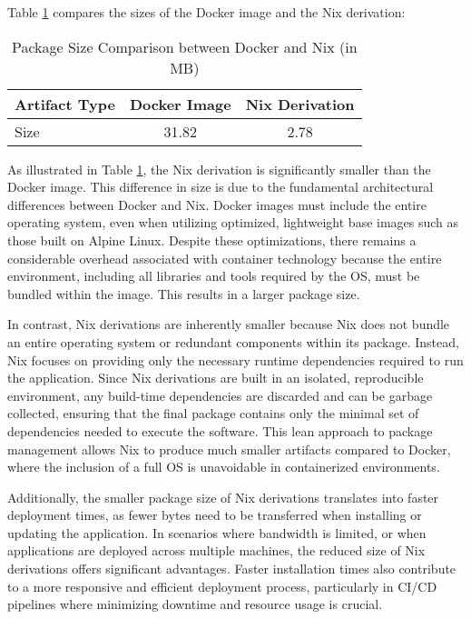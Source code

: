 Table \ref{tab:package_size} compares the sizes of the Docker image and the Nix derivation:

\begin{table}[H]
	\centering
	\caption{Package Size Comparison between Docker and Nix (in MB)}
	\label{tab:package_size}
	\begin{tabular}{|l|c|c|}
		\hline
		\textbf{Artifact Type} & \textbf{Docker Image} & \textbf{Nix Derivation} \\
		\hline
		Size                   & 31.82                 & 2.78                    \\
		\hline
	\end{tabular}
\end{table}

As illustrated in Table \ref{tab:package_size}, the Nix derivation is significantly smaller
than the Docker image. This difference in size is due to the fundamental architectural
differences between Docker and Nix. Docker images must include the entire operating system,
even when utilizing optimized, lightweight base images such as those built on Alpine Linux.
Despite these optimizations, there remains a considerable overhead associated with container
technology because the entire environment, including all libraries and tools required by
the OS, must be bundled within the image. This results in a larger package size.

In contrast, Nix derivations are inherently smaller because Nix does not bundle an entire
operating system or redundant components within its package. Instead, Nix focuses on
providing only the necessary runtime dependencies required to run the application. Since
Nix derivations are built in an isolated, reproducible environment, any build-time
dependencies are discarded and can be garbage collected, ensuring that the final package
contains only the minimal set of dependencies needed to execute the software. This lean
approach to package management allows Nix to produce much smaller artifacts compared to
Docker, where the inclusion of a full OS is unavoidable in containerized environments.

Additionally, the smaller package size of Nix derivations translates into faster deployment
times, as fewer bytes need to be transferred when installing or updating the application.
In scenarios where bandwidth is limited, or when applications are deployed across multiple
machines, the reduced size of Nix derivations offers significant advantages. Faster
installation times also contribute to a more responsive and efficient deployment process,
particularly in CI/CD pipelines where minimizing downtime and resource usage is crucial.


